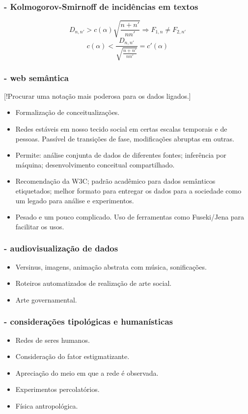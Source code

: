 \documentclass[10pt]{beamer}
\begin{document}
\begin{frame}
\frametitle{- Kolmogorov-Smirnoff de incidências em textos}
\begin{equation}\label{eq:ks}
D_{n,n'} > c(\alpha)\sqrt{\frac{n+n'}{nn'}} \Rightarrow F_{1,n} \neq F_{2,n'}
\end{equation}
\vspace{2cm}
\begin{equation}\label{eq:ks}
c(\alpha) < \frac{D_{n,n'}}{\sqrt{\frac{n+n'}{nn'}}} = c'(\alpha)
\end{equation}
\end{frame}
\begin{frame}
\frametitle{- web semântica}
[!Procurar uma notação mais poderosa para os dados ligados.]
\begin{itemize}
	\item Formalização de conceitualizações.
	\item Redes estáveis em nosso tecido social em certas escalas temporais e de pessoas.
		Passível de transições de fase, modificações abruptas em outras.
	\item Permite: análise conjunta de dados de diferentes fontes; inferência por máquina; desenvolvimento conceitual compartilhado.
	\item Recomendação da W3C; padrão acadêmico para dados semânticos etiquetados; melhor formato para entregar os dados para a sociedade como um legado para análise e experimentos.
	\item Pesado e um pouco complicado. Uso de ferramentas como Fuseki/Jena para facilitar os usos.
\end{itemize}

\end{frame}
\begin{frame}
\frametitle{- audiovisualização de dados}
\begin{itemize}
	\item Versinus, imagens, animação abstrata com música, sonificações.
	\item Roteiros automatizados de realização de arte social.
	\item Arte governamental.
\end{itemize}
\end{frame}

\begin{frame}
\frametitle{- considerações tipológicas e humanísticas}
\begin{itemize}
	\item Redes de seres humanos.
	\item Consideração do fator estigmatizante.
	\item Apreciação do meio em que a rede é observada.
	\item Experimentos percolatórios.
	\item Física antropológica.
\end{itemize}
\end{frame}
\end{document}
